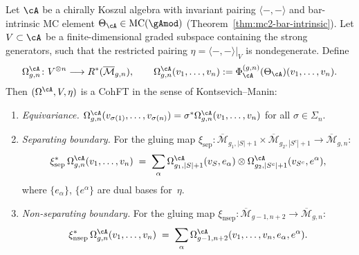 \begin{theorem}
\label{thm:shadow-cohft}
\ClaimStatusProvedHere
{}
Let $\cA$ be a chirally Koszul algebra with invariant pairing
$\langle{-},{-}\rangle$ and bar-intrinsic MC element
$\Theta_\cA \in \operatorname{MC}(\gAmod)$
\textup{(}Theorem~\textup{\ref{thm:mc2-bar-intrinsic}}\textup{)}.
Let $V \subset \cA$ be a finite-dimensional graded subspace
containing the strong generators, such that the restricted
pairing $\eta = \langle{-},{-}\rangle|_V$ is nondegenerate.
Define
\begin{equation}\label{eq:shadow-cohft}
\Omega_{g,n}^{\cA}
\colon V^{\otimes n} \longrightarrow R^*(\overline{\mathcal{M}}_{g,n}),
\qquad
\Omega_{g,n}^{\cA}(v_1, \ldots, v_n)
:=
\Phi_{\cA}^{(g,n)}(\Theta_\cA)(v_1, \ldots, v_n).
\end{equation}
Then
$(\Omega^{\cA},V,\eta)$ is a CohFT in the sense of Kontsevich--Manin:
\begin{enumerate}[label=\textup{(\roman*)}]
\item \emph{Equivariance.}
  $\Omega_{g,n}^{\cA}(v_{\sigma(1)}, \ldots, v_{\sigma(n)})
  = \sigma^* \Omega_{g,n}^{\cA}(v_1, \ldots, v_n)$
  for all $\sigma \in \Sigma_n$.

\item \emph{Separating boundary.}
  For the gluing map
  $\xi_{\mathrm{sep}} \colon
  \overline{\mathcal{M}}_{g_1, |S|+1} \times
  \overline{\mathcal{M}}_{g_2, |S^c|+1} \to
  \overline{\mathcal{M}}_{g,n}$:
  \[
  \xi_{\mathrm{sep}}^*\,\Omega_{g,n}^{\cA}(v_1, \ldots, v_n)
  \;=\;
  \sum_\alpha
  \Omega_{g_1,|S|+1}^{\cA}(v_S, e_\alpha)
  \otimes
  \Omega_{g_2,|S^c|+1}^{\cA}(v_{S^c}, e^\alpha),
  \]
  where $\{e_\alpha\}$, $\{e^\alpha\}$ are dual bases for~$\eta$.

\item \emph{Non-separating boundary.}
  For the gluing map
  $\xi_{\mathrm{nsep}} \colon
  \overline{\mathcal{M}}_{g-1,n+2} \to
  \overline{\mathcal{M}}_{g,n}$:
  \[
  \xi_{\mathrm{nsep}}^*\,\Omega_{g,n}^{\cA}(v_1, \ldots, v_n)
  \;=\;
  \sum_\alpha
  \Omega_{g-1,n+2}^{\cA}(v_1, \ldots, v_n, e_\alpha, e^\alpha).
  \]
\end{enumerate}
\end{theorem}

